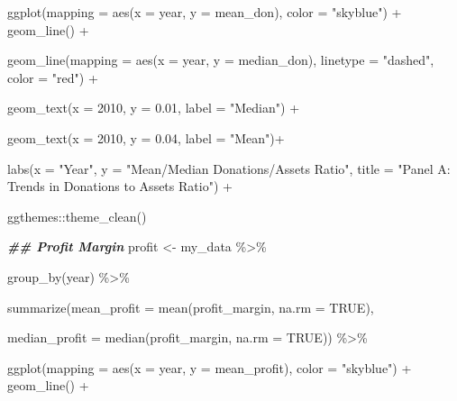 \documentclass[a4paper,nobind]{templates/ociamthesis}
\newenvironment{Shaded}{\begin{snugshade}}{\end{snugshade}}
\newcommand{\AttributeTok}[1]{\textcolor[rgb]{0.77,0.63,0.00}{#1}}
\newcommand{\ConstantTok}[1]{\textcolor[rgb]{0.00,0.00,0.00}{#1}}
\newcommand{\DecValTok}[1]{\textcolor[rgb]{0.00,0.00,0.81}{#1}}
\newcommand{\DocumentationTok}[1]{\textcolor[rgb]{0.56,0.35,0.01}{\textbf{\textit{#1}}}}
\newcommand{\FloatTok}[1]{\textcolor[rgb]{0.00,0.00,0.81}{#1}}
\newcommand{\FunctionTok}[1]{\textcolor[rgb]{0.00,0.00,0.00}{#1}}
\newcommand{\NormalTok}[1]{#1}
\newcommand{\OtherTok}[1]{\textcolor[rgb]{0.56,0.35,0.01}{#1}}
\newcommand{\SpecialCharTok}[1]{\textcolor[rgb]{0.00,0.00,0.00}{#1}}
\newcommand{\StringTok}[1]{\textcolor[rgb]{0.31,0.60,0.02}{#1}}
\renewenvironment{Shaded}
{
  \vspace{10pt}%
  \begin{snugshade}%
}{%
  \end{snugshade}%
  \vspace{8pt}%
}
\begin{document}
\begin{Shaded}
\begin{Highlighting}[]
  \FunctionTok{ggplot}\NormalTok{(}\AttributeTok{mapping =} \FunctionTok{aes}\NormalTok{(}\AttributeTok{x =}\NormalTok{ year, }\AttributeTok{y =}\NormalTok{ mean\_don), }\AttributeTok{color =} \StringTok{"skyblue"}\NormalTok{) }\SpecialCharTok{+} \FunctionTok{geom\_line}\NormalTok{() }\SpecialCharTok{+}
  
  \FunctionTok{geom\_line}\NormalTok{(}\AttributeTok{mapping =} \FunctionTok{aes}\NormalTok{(}\AttributeTok{x =}\NormalTok{ year, }\AttributeTok{y =}\NormalTok{ median\_don), }\AttributeTok{linetype =} \StringTok{"dashed"}\NormalTok{, }\AttributeTok{color =} \StringTok{"red"}\NormalTok{) }\SpecialCharTok{+}
  
  \FunctionTok{geom\_text}\NormalTok{(}\AttributeTok{x =} \DecValTok{2010}\NormalTok{, }\AttributeTok{y =} \FloatTok{0.01}\NormalTok{, }\AttributeTok{label =} \StringTok{"Median"}\NormalTok{) }\SpecialCharTok{+} 
  
  \FunctionTok{geom\_text}\NormalTok{(}\AttributeTok{x =} \DecValTok{2010}\NormalTok{, }\AttributeTok{y =} \FloatTok{0.04}\NormalTok{, }\AttributeTok{label =} \StringTok{"Mean"}\NormalTok{)}\SpecialCharTok{+}
  
  \FunctionTok{labs}\NormalTok{(}\AttributeTok{x =} \StringTok{"Year"}\NormalTok{, }\AttributeTok{y =} \StringTok{"Mean/Median Donations/Assets Ratio"}\NormalTok{, }\AttributeTok{title =} \StringTok{"Panel A: Trends in Donations to Assets Ratio"}\NormalTok{) }\SpecialCharTok{+} 
  
\NormalTok{  ggthemes}\SpecialCharTok{::}\FunctionTok{theme\_clean}\NormalTok{()}

\DocumentationTok{\#\# Profit Margin}
\NormalTok{profit }\OtherTok{\textless{}{-}}\NormalTok{ my\_data }\SpecialCharTok{\%\textgreater{}\%} 
  
  \FunctionTok{group\_by}\NormalTok{(year) }\SpecialCharTok{\%\textgreater{}\%} 
  
  \FunctionTok{summarize}\NormalTok{(}\AttributeTok{mean\_profit =} \FunctionTok{mean}\NormalTok{(profit\_margin, }\AttributeTok{na.rm =} \ConstantTok{TRUE}\NormalTok{), }
                               
  \AttributeTok{median\_profit =} \FunctionTok{median}\NormalTok{(profit\_margin, }\AttributeTok{na.rm =} \ConstantTok{TRUE}\NormalTok{)) }\SpecialCharTok{\%\textgreater{}\%} 
  
  \FunctionTok{ggplot}\NormalTok{(}\AttributeTok{mapping =} \FunctionTok{aes}\NormalTok{(}\AttributeTok{x =}\NormalTok{ year, }\AttributeTok{y =}\NormalTok{ mean\_profit), }\AttributeTok{color =} \StringTok{"skyblue"}\NormalTok{) }\SpecialCharTok{+} \FunctionTok{geom\_line}\NormalTok{() }\SpecialCharTok{+}
  

\end{Highlighting}
\end{Shaded}
\end{document}
